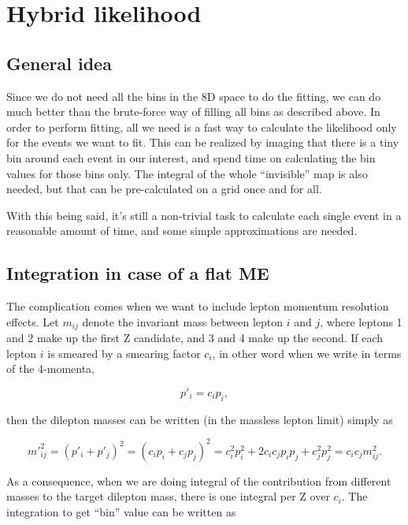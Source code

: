 \documentclass{cmspaper}
\begin{document}
\section{Hybrid likelihood}

\subsection{General idea}

Since we do not need all the bins in the 8D space to do the fitting, we can do much better than the
brute-force way of filling all bins as described above.  In order to perform fitting, all we need
is a fast way to calculate the likelihood only for the events we want to fit.  This can be realized
by imaging that there is a tiny bin around each event in our interest, and spend time on calculating
the bin values for those bins only.  The integral of the whole ``invisible'' map is also needed,
but that can be pre-calculated on a grid once and for all.

With this being said, it's still a non-trivial task to calculate each single event in a reasonable
amount of time, and some simple approximations are needed.

\subsection{Integration in case of a flat ME}

The complication comes when we want to include lepton momentum resolution effects.  Let $m_{ij}$
denote the invariant mass between lepton $i$ and $j$, where leptons 1 and 2 make up the first Z
candidate, and 3 and 4 make up the second.  If each lepton $i$ is smeared by a smearing factor $c_i$,
in other word when we write in terms of the 4-momenta,

\begin{equation}
p'_i = c_i p_i,
\end{equation}

then the dilepton masses can be written (in the massless lepton limit) simply as

\begin{equation}
{m'}_{ij}^2 = (p'_i + p'_j)^2 = (c_i p_i + c_j p_j)^2 = c_i^2 p_i^2 + 2 c_i c_j p_i p_j + c_j^2 p_j^2
   = c_i c_j m_{ij}^2.
\end{equation}

As a consequence, when we are doing integral of the contribution from different masses to the target
dilepton mass, there is one integral per Z over $c_i$.  The integration to get ``bin'' value can be
written as
\end{document}
